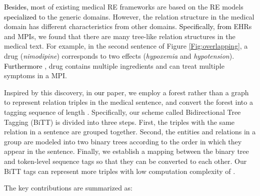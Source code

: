 \documentclass[conference]{IEEEtran}
\newcommand{\yankun}[1]{\textcolor{black}{#1}}
\begin{document}
\yankun{Besides, m}ost of 
existing medical RE frameworks are based on the RE models 
\yankun{specialized}
to the generic domains. However, the relation structure in the medical domain has different characteristics from other domains. \yankun{Specifically}, 
\yankun{from }EHRs and MPIs, we found that there are many tree-like relation structures in the medical text. For example, in the second sentence of Figure \ref{Fig:overlapping}, a drug (\emph{nimodipine}) corresponds to two effects (\emph{hypoxemia} and \emph{hypotension}). 
\yankun{Furthermore}
, drug contains multiple ingredients and can treat multiple symptoms in a MPI. 

Inspired by this discovery, in 
\yankun{our }paper, we employ a forest rather than a graph to represent relation triples in the medical sentence, and convert the forest into a tagging sequence of length . Specifically, our scheme called Bidirectional Tree Tagging (BiTT) is divided into three steps. First, the triples with the same relation in a sentence are grouped together. Second, the entities and relations in a group are modeled into two binary trees according to the order in which they appear in the sentence. Finally, we establish a mapping between the binary tree and token-level sequence tags so that they can be converted to each other. Our BiTT tags can represent more triples with low computation complexity of .


The key contributions are summarized as:
\end{document}
